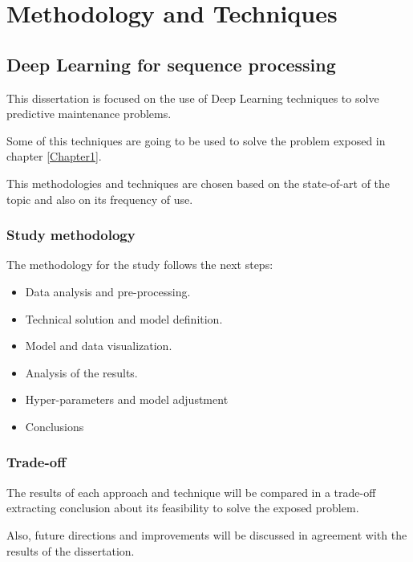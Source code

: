 
\chapter{Methodology and Techniques} %

\label{Chapter2}


\section{Deep Learning for sequence processing}

This dissertation is focused on the use of Deep Learning techniques to solve predictive maintenance problems.

Some of this techniques are going to be used to solve the problem exposed in chapter \ref{Chapter1}.

This methodologies and techniques are chosen based on the state-of-art of the topic and also on its frequency of use.


\subsection{Study methodology}

The methodology for the study follows the next steps:

\begin{itemize}
    \item Data analysis and pre-processing.
    \item Technical solution and model definition.
    \item Model and data visualization.
    \item Analysis of the results.
    \item Hyper-parameters and model adjustment
    \item Conclusions
\end{itemize}


\subsection{Trade-off}

The results of each approach and technique will be compared in a trade-off extracting conclusion about its feasibility to solve the exposed problem.

Also, future directions and improvements will be discussed in agreement with the results of the dissertation.